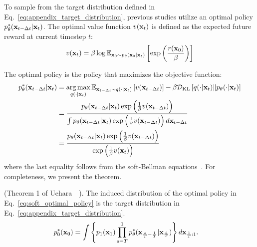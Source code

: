 To sample from the target distribution defined in Eq.~\ref{eq:appendix_target_distribution}, previous studies utilize an optimal policy $p^{*}_\theta(\mathbf{x}_{t - \Delta t} | \mathbf{x}_{t})$. 
The optimal value function $v(\mathbf{x}_{t})$ is defined as the expected future reward at current timestep $t$:
\begin{align}
    \label{eq:appendix_value_func}
    v(\mathbf{x}_t) = \beta \log \mathbb{E}_{\mathbf{x}_0 \sim p_{\theta} (\mathbf{x}_0 | \mathbf{x}_t)} \left[ \exp \left(  \frac{r(\mathbf{x}_0)}{\beta} \right) \right]
\end{align}

The optimal policy is the policy that maximizes the objective function:
\begin{align}
    \nonumber
    p_{\theta}^{*}(\mathbf{x}_{t-\Delta t} | \mathbf{x}_{t}) &= \operatorname*{arg\,max}_{q(\cdot|\mathbf{x}_t)} \mathbb{E}_{\mathbf{x}_{t-\Delta t}\sim q(\cdot|\mathbf{x}_t)} \left[ v(\mathbf{x}_{t-\Delta t}) \right] -\beta \mathcal{D}_{\text{KL}} \left[ q(\cdot | \mathbf{x}_{t}) \| p_\theta(\cdot | \mathbf{x}_{t}) \right] \\
    \label{eq:soft_optimal_policy}
    &= \frac{p_\theta(\mathbf{x}_{t-\Delta t} | \mathbf{x}_{t}) \exp \left( \frac{1}{\beta} v(\mathbf{x}_{t-\Delta t}) \right)}{\int p_\theta (\mathbf{x}_{t-\Delta t} | \mathbf{x}_t) \exp \left( \frac{1}{\beta} v(\mathbf{x}_{t-\Delta t}) \right) d\mathbf{x}_{t-\Delta t} }\\
    \label{eq:a.2.optmal_policy}
    &=\frac{p_\theta(\mathbf{x}_{t-\Delta t} | \mathbf{x}_{t}) \exp \left( \frac{1}{\beta} v(\mathbf{x}_{t-\Delta t}) \right)}{\exp \left( \frac{1}{\beta} v(\mathbf{x}_{t}) \right)}
\end{align}
where the last equality follows from the soft-Bellman equations~\cite{Uehara:2024Bridging}.  
For completeness, we present the theorem. 
\begin{theorem}
    \textnormal{(Theorem 1 of Uehara~\etal~\cite{Uehara:2024Bridging})}. The induced distribution of the optimal policy in Eq.~\ref{eq:soft_optimal_policy} is the target distribution in Eq.~\ref{eq:appendix_target_distribution}.
    \begin{align}
        \nonumber
        p^{*}_0(\mathbf{x}_0) &= \int \left\{ p_1(\mathbf{x}_1) \prod_{s=T}^{1} p_{\theta}^{*}(\mathbf{x}_{\frac{s}{T} - \frac{1}{T}} | \mathbf{x}_{\frac{s}{T}}) \right \} d\mathbf{x}_{\frac{1}{T}:1}.
    \end{align}
\end{theorem}

